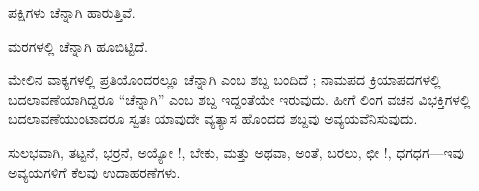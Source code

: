 \noindent\hspace*{2.2em}ಪಕ್ಷಿಗಳು ಚೆನ್ನಾಗಿ ಹಾರುತ್ತಿವೆ.\par

\noindent\hspace*{2.2em}ಮರಗಳಲ್ಲಿ ಚೆನ್ನಾಗಿ ಹೂಬಿಟ್ಟಿದೆ.\par

\indent ಮೇಲಿನ ವಾಕ್ಯಗಳಲ್ಲಿ ಪ್ರತಿಯೊಂದರಲ್ಲೂ ಚೆನ್ನಾಗಿ ಎಂಬ ಶಬ್ದ ಬಂದಿದೆ ; ನಾಮಪದ ಕ್ರಿಯಾಪದಗಳಲ್ಲಿ ಬದಲಾವಣೆಯಾಗಿದ್ದರೂ “ಚೆನ್ನಾಗಿ” ಎಂಬ ಶಬ್ದ ಇದ್ದಂತೆಯೇ ಇರುವುದು. ಹೀಗೆ ಲಿಂಗ ವಚನ ವಿಭಕ್ತಿಗಳಲ್ಲಿ ಬದಲಾವಣೆಯುಂಟಾದರೂ ಸ್ವತಃ ಯಾವುದೇ ವ್ಯತ್ಯಾಸ ಹೊಂದದ ಶಬ್ದವು ಅವ್ಯಯವೆನಿಸುವುದು.\par

\indent ಸುಲಭವಾಗಿ, ತಟ್ಟನೆ, ಭರ್ರನೆ, ಅಯ್ಯೋ !, ಬೇಕು, ಮತ್ತು ಅಥವಾ, ಅಂತೆ, ಬರಲು, ಛೀ !, ಧಗಧಗ—ಇವು ಅವ್ಯಯಗಳಿಗೆ ಕೆಲವು ಉದಾಹರಣೆಗಳು.\par
